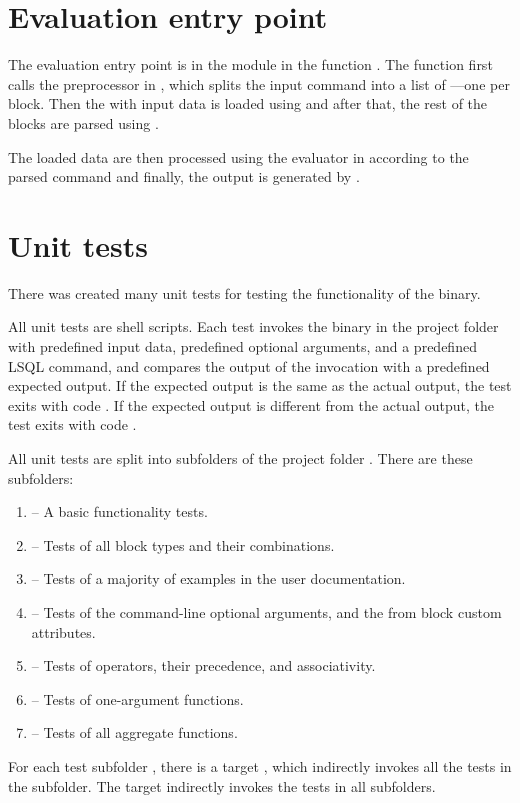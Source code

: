 \section{Evaluation entry point}
The evaluation entry point is in the module  in the function . 
The function first calls the preprocessor in , which splits the input command into a list of ---one  per block. 
Then the  with input data is loaded using  and after that,
the rest of the blocks are parsed using . 

The loaded data are then processed using the evaluator in
 according to the parsed command and finally, the output is generated by .


\section{Unit tests}
There was created many unit tests for testing the functionality of the  binary.

All unit tests are shell scripts. Each test invokes the  binary in the  project folder
with predefined input data, predefined optional arguments, and a predefined LSQL command, and compares
the output of the  invocation with a predefined expected output.
If the expected output is the same as the actual output, the test exits with code . 
If the expected output is different from the actual output, the test exits with code . 

All unit tests are split into subfolders of the project folder .
There are these subfolders:
\begin{enumerate}
    \item {} -- A basic functionality tests.
    \item {} -- Tests of all block types and their combinations.
    \item {} -- Tests of a majority of examples in the user documentation.
    \item {} -- Tests of the command-line optional arguments, and the from block custom attributes.
    \item {} -- Tests of operators, their precedence, and associativity.
    \item {} -- Tests of one-argument functions.
    \item {} -- Tests of all aggregate functions.
\end{enumerate}

For each test subfolder , there is a  target , which indirectly invokes all the tests in the subfolder. 
The  target  indirectly invokes the tests in all subfolders.

